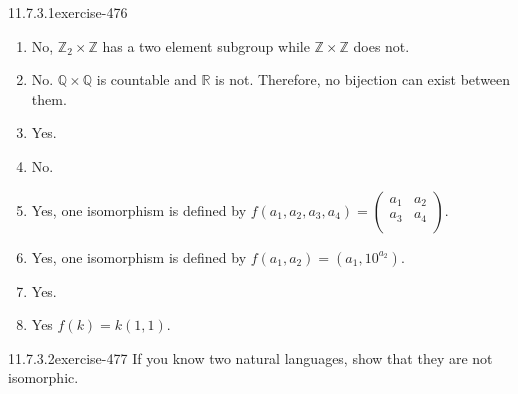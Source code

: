\documentclass[twoside,10pt,]{book}
\numberwithin{equation}{section}
\begin{document}
\begin{divisionsolution}{11.7.3.1}{}{exercise-476}
\begin{enumerate}[label=(\alph*)]
Yes, \(f(n, x) = (x, n)\) for \((n, x) \in  \mathbb{Z} \times  \mathbb{R}\) is an isomorphism.%
\item\hypertarget{li-1954}{}\hypertarget{p-4271}{}%
No, \(\mathbb{Z}_2\times  \mathbb{Z}\) has a two element subgroup while \(\mathbb{Z} \times  \mathbb{Z}\) does not.%
\item\hypertarget{li-1955}{}\hypertarget{p-4272}{}%
No. \(\mathbb{Q} \times  \mathbb{Q}\) is countable and \(\mathbb{R}\) is not.  Therefore, no bijection can exist between them.%
\item\hypertarget{li-1956}{}\hypertarget{p-4273}{}%
Yes.%
\item\hypertarget{li-1957}{}\hypertarget{p-4274}{}%
No.%
\item\hypertarget{li-1958}{}\hypertarget{p-4275}{}%
Yes,  one isomorphism is defined by \(f\left(a_1, a_2,a_3,a_4\right)=\left(
\begin{array}{cc}
a_1 & a_2 \\
a_3 & a_4 \\
\end{array}
\right)\).%
\item\hypertarget{li-1959}{}\hypertarget{p-4276}{}%
Yes, one isomorphism is defined by \(f\left(a_1,a_2\right)=\left(a_1,10^{a_2}\right)\).%
\item\hypertarget{li-1960}{}\hypertarget{p-4277}{}%
Yes.%
\item\hypertarget{li-1961}{}\hypertarget{p-4278}{}%
Yes   \(f(k) = k(1,1)\).%
\end{enumerate}
%
\end{divisionsolution}%
\begin{divisionsolution}{11.7.3.2}{}{exercise-477}%
\hypertarget{p-4279}{}%
If you know two natural languages, show that they are not isomorphic.%
\end{divisionsolution}%
\end{document}
